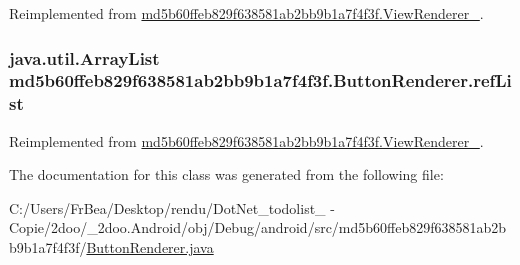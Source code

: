 Reimplemented from \hyperlink{classmd5b60ffeb829f638581ab2bb9b1a7f4f3f_1_1_view_renderer__2_80b609e3e4054c380887d4dc2907a875}{md5b60ffeb829f638581ab2bb9b1a7f4f3f.ViewRenderer\_}.\hypertarget{classmd5b60ffeb829f638581ab2bb9b1a7f4f3f_1_1_button_renderer_c9e5222d65858404501d5566e4a2de8a}{
\subsubsection[{refList}]{\setlength{\rightskip}{0pt plus 5cm}java.util.ArrayList {\bf md5b60ffeb829f638581ab2bb9b1a7f4f3f.ButtonRenderer.refList}}}
\label{classmd5b60ffeb829f638581ab2bb9b1a7f4f3f_1_1_button_renderer_c9e5222d65858404501d5566e4a2de8a}




Reimplemented from \hyperlink{classmd5b60ffeb829f638581ab2bb9b1a7f4f3f_1_1_view_renderer__2_6c151401977148a92c515e9c7de1aaf8}{md5b60ffeb829f638581ab2bb9b1a7f4f3f.ViewRenderer\_}.

The documentation for this class was generated from the following file:\begin{CompactItemize}
\item 
C:/Users/FrBea/Desktop/rendu/DotNet\_\-todolist\_ - Copie/2doo/\_\-2doo.Android/obj/Debug/android/src/md5b60ffeb829f638581ab2bb9b1a7f4f3f/\hyperlink{md5b60ffeb829f638581ab2bb9b1a7f4f3f_2_button_renderer_8java}{ButtonRenderer.java}\end{CompactItemize}
